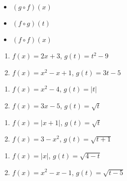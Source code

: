 \documentclass{ximera}
\begin{document}
\begin{multicols}{3}

\begin{itemize}

\item  $(g \circ f)(x)$

\item  $(f \circ g)(t)$

\item  $(f \circ f)(x)$


\end{itemize}

\end{multicols}


\begin{multicols}{2}
\begin{enumerate}
\setcounter{enumi}{\value{HW}}

\item  $f(x) = 2x+3$, $g(t) = t^2-9$ \label{funccompexp1first}
\item  $f(x) = x^2 -x+1$, $g(t) = 3t-5$ 

\setcounter{HW}{\value{enumi}}
\end{enumerate}
\end{multicols}

\begin{multicols}{2}
\begin{enumerate}
\setcounter{enumi}{\value{HW}}

\item  $f(x) = x^2-4$, $g(t) = |t|$
\item  $f(x) = 3x-5$, $g(t) = \sqrt{t}$ 

\setcounter{HW}{\value{enumi}}
\end{enumerate}
\end{multicols}

\begin{multicols}{2}
\begin{enumerate}
\setcounter{enumi}{\value{HW}}

\item  $f(x) = |x+1|$, $g(t) = \sqrt{t}$
\item  $f(x) = 3-x^2$, $g(t) = \sqrt{t+1}$ 

\setcounter{HW}{\value{enumi}}
\end{enumerate}
\end{multicols}

\begin{multicols}{2}
\begin{enumerate}
\setcounter{enumi}{\value{HW}}

\item  $f(x) = |x|$, $g(t) = \sqrt{4-t}$
\item  $f(x) = x^2-x-1$, $g(t) = \sqrt{t-5}$ 

\setcounter{HW}{\value{enumi}}
\end{enumerate}
\end{multicols}
\end{document}

